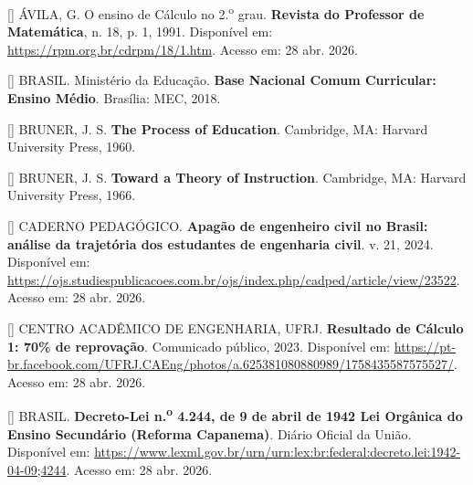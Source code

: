 \documentclass[12pt,a4paper,oneside]{article}
\begin{document}
\begin{singlespace}
\noindent\hangindent=1.25cm
[\theequation\label{ref:avila-rpm18}]
ÁVILA, G. O ensino de Cálculo no 2.\textsuperscript{o} grau.
\textbf{Revista do Professor de Matemática}, n. 18, p.
1, 1991. Disponível em:
\url{https://rpm.org.br/cdrpm/18/1.htm}. Acesso em: 28 abr.
2026.\par\smallskip

\noindent\hangindent=1.25cm
[\theequation\label{ref:bncc-2018}]
BRASIL. Ministério da Educação. \textbf{Base Nacional Comum
Curricular: Ensino Médio}. Brasília: MEC, 2018.\par\smallskip

\noindent\hangindent=1.25cm
[\theequation\label{ref:bruner-1960}]
BRUNER, J. S. \textbf{The Process of Education}. Cambridge, MA:
Harvard University Press, 1960.\par\smallskip

\noindent\hangindent=1.25cm
[\theequation\label{ref:bruner-1966}]
BRUNER, J. S. \textbf{Toward a Theory of Instruction}. Cambridge,
MA: Harvard University Press, 1966.\par\smallskip

\noindent\hangindent=1.25cm
[\theequation\label{ref:caderno-pedagogico}]
CADERNO PEDAGÓGICO. \textbf{Apagão de engenheiro civil no Brasil:
análise da trajetória dos estudantes de engenharia civil}. v. 21,
2024. Disponível em:
\url{https://ojs.studiespublicacoes.com.br/ojs/index.php/cadped/article/view/23522}.
Acesso em: 28 abr. 2026.\par\smallskip

\noindent\hangindent=1.25cm
[\theequation\label{ref:caeng-ufrj}]
CENTRO ACADÊMICO DE ENGENHARIA, UFRJ. \textbf{Resultado de Cálculo
1: 70\% de reprovação}. Comunicado público, 2023. Disponível em:
\url{https://pt-br.facebook.com/UFRJ.CAEng/photos/a.625381080880989/1758435587575527/}.
Acesso em: 28 abr. 2026.\par\smallskip

\noindent\hangindent=1.25cm
[\theequation\label{ref:capanema-decreto}]
BRASIL. \textbf{Decreto-Lei n.\textsuperscript{o} 4.244, de 9 de
abril de 1942 \textemdash{} Lei Orgânica do Ensino Secundário
(Reforma Capanema)}. Diário Oficial da União. Disponível em:
\url{https://www.lexml.gov.br/urn/urn:lex:br:federal:decreto.lei:1942-04-09;4244}.
Acesso em: 28 abr. 2026.\par\smallskip


\end{singlespace}
\end{document}
